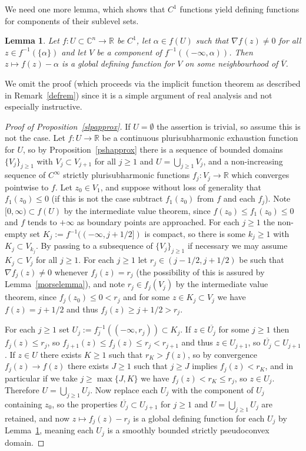 \documentclass[11pt,a4paper, final, twoside]{article}
\newtheorem{lemma}[theorem]{Lemma}
\numberwithin{equation}{section}
\newcommand{\C}{\mathbb C}
\newcommand{\R}{\mathbb R}
\newcommand{\clos}[1]{\overline{#1}}
\newcommand{\cts}{C}
\newcommand{\cgrad}[1]{\nabla #1}
\begin{document}
We need one more lemma, which shows that $\cts^1$ functions yield defining functions for components of their sublevel sets. 
\begin{lemma}
\label{globdefworks}
Let $f\colon U\subset\C^n\to\R$ be $\cts^1$, let $\alpha\in f(U)$ such that $\cgrad{f}(z)\neq 0$ for all $z\in f^{-1}(\{\alpha\})$ and let $V$ be a component of $f^{-1}((-\infty,\alpha))$.
Then $z\mapsto f(z)-\alpha$ is a global defining function for $V$ on some neighbourhood of $\clos V$.
\end{lemma}
We omit the proof (which proceeds via the implicit function theorem
as described in Remark~\ref{defrem}) since it is a simple argument of real analysis and not especially instructive.
\begin{proof}[Proof of Proposition~\ref{slpapprox}]
If $U=\emptyset$ the assertion is trivial, so assume this is not the case.
Let $f\colon U\to\R$ be a continuous plurisubharmonic exhaustion function for $U$, so by Proposition~\ref{pshapprox} there is a sequence of bounded domains $\{V_j\}_{j\geq 1}$
with $V_j\subset V_{j+1}$ for all $j\geq 1$ and $U=\bigcup_{j\geq 1}V_j$, and a non-increasing sequence of $\cts^\infty$ strictly plurisubharmonic functions $f_j\colon V_j\to \R$ which converges pointwise 
to $f$.
Let $z_0\in V_1$, and suppose without loss of generality that $f_1(z_0)\leq 0$ (if this is not the case subtract $f_1(z_0)$ from $f$ and each $f_j$). Note 
$[0,\infty)\subset f(U)$ by the intermediate value theorem, since $f(z_0)\leq f_1(z_0)\leq 0$ and $f$ tends to $+\infty$ as boundary points are approached.
For each $j\geq 1$ the non-empty set $K_j:=f^{-1}((-\infty,j+1/2])$ is compact, so there is some $k_j\geq 1$ with $K_j\subset V_{k_j}$. By passing to a subsequence of $\{V_j\}_{j\geq 1}$
if necessary we may assume $K_j\subset V_j$ for all $j\geq 1$. For each $j\geq 1$ let $r_j\in (j-1/2,j+1/2)$ be such that $\cgrad{f_j}(z)\neq 0$ whenever $f_j(z)=r_j$ (the possibility of
this is assured by Lemma~\ref{morselemma}), and note $r_j\in f_j(V_j)$ by the intermediate value theorem, since $f_j(z_0)\leq 0<r_j$ and for some $z\in K_j\subset V_j$ we have $f(z)=j+1/2$ and thus
$f_j(z)\geq j+1/2>r_j$.

For each $j\geq 1$ set $U_j:=f_j^{-1}((-\infty,r_j))\subset K_j$. If $z\in \clos{U_j}$ for some $j\geq 1$ then $f_j(z)\leq r_j$, so $f_{j+1}(z)\leq f_j(z)\leq r_j<r_{j+1}$ and thus $z\in U_{j+1}$, so $\clos{U_j}\subset U_{j+1}$.
If $z\in U$ there exists $K\geq 1$ such that $r_K>f(z)$, so by convergence $f_j(z)\to f(z)$ there exists $J\geq 1$ such that $j\geq J$ implies $f_j(z)<r_K$, and in particular if we take $j\geq \max\{J,K\}$
we have $f_j(z)<r_K\leq r_j$, so $z\in U_j$. Therefore $U=\bigcup_{j\geq 1} U_j$. Now replace each $U_j$ with the component of $U_j$ containing $z_0$, so the properties
$\clos{U_j}\subset U_{j+1}$ for $j\geq 1$ and $U=\bigcup_{j\geq 1} U_j$ are retained, and now
$z\mapsto f_j(z)-r_j$ is a global defining function for each $U_j$ by Lemma~\ref{globdefworks}, meaning each $U_j$ is a smoothly bounded strictly pseudoconvex domain.
\end{proof}
\end{document}
